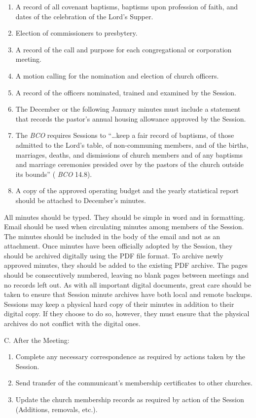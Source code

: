 \documentclass[
]{book}
\providecommand{\tightlist}{%
  \setlength{\itemsep}{0pt}\setlength{\parskip}{0pt}}
\begin{document}
\begin{enumerate}
\def\labelenumi{\arabic{enumi}.}
\tightlist
\item
  A record of all covenant baptisms, baptisms upon profession of faith, and dates of the celebration of the Lord's Supper.
\item
  Election of commissioners to presbytery.
\item
  A record of the call and purpose for each congregational or corporation meeting.
\item
  A motion calling for the nomination and election of church officers.
\item
  A record of the officers nominated, trained and examined by the Session.
\item
  The December or the following January minutes must include a statement that records the pastor's annual housing allowance approved by the Session.
\item
  The \emph{BCO} requires Sessions to ``\ldots keep a fair record of baptisms, of those admitted to the Lord's table, of non-communing members, and of the births, marriages, deaths, and dismissions of church members and of any baptisms and marriage ceremonies presided over by the pastors of the church outside its bounds'' ( \emph{BCO} 14.8).
\item
  A copy of the approved operating budget and the yearly statistical report should be attached to December's minutes.
\end{enumerate}

All minutes should be typed. They should be simple in word and in formatting. Email should be used when circulating minutes among members of the Session. The minutes should be included in the body of the email and not as an attachment. Once minutes have been officially adopted by the Session, they should be archived digitally using the PDF file format. To archive newly approved minutes, they should be added to the existing PDF archive. The pages should be consecutively numbered, leaving no blank pages between meetings and no records left out. As with all important digital documents, great care should be taken to ensure that Session minute archives have both local and remote backups. Sessions may keep a physical hard copy of their minutes in addition to their digital copy. If they choose to do so, however, they must ensure that the physical archives do not conflict with the digital ones.

C. After the Meeting:

\begin{enumerate}
\def\labelenumi{\arabic{enumi}.}
\tightlist
\item
  Complete any necessary correspondence as required by actions taken by the Session.
\item
  Send transfer of the communicant's membership certificates to other churches.
\item
  Update the church membership records as required by action of the Session (Additions, removals, etc.).
\end{enumerate}
\end{document}
